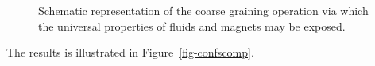 \documentclass[
  letterpaper,
  enabledeprecatedfontcommands]{report}
\begin{document}
\begin{figure}


\caption{\label{fig-fmcoarse}Schematic representation of the coarse
graining operation via which the universal properties of fluids and
magnets may be exposed.}

\end{figure}%

The results is illustrated in Figure~\ref{fig-confscomp}.
\end{document}
